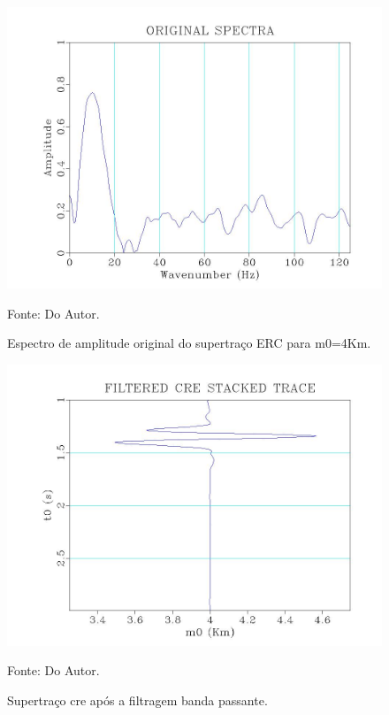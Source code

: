 \begin{figure}
\caption{Espectro de amplitude original do supertraço ERC para m0=4Km.}
\begin{center}
\includegraphics[scale=0.4]{images/originalSpectra.jpeg}
\vspace{-0.3cm}
\end{center}
\begin{center}
 Fonte: Do Autor.
\end{center}
\label{fig:7.3}
\end{figure}

\begin{figure}
\caption{Supertraço cre após a filtragem banda passante.}
\begin{center}
\includegraphics[scale=0.4]{images/creStackedSectionFiltered.jpeg}
\vspace{-0.3cm}
\end{center}
\begin{center}
 Fonte: Do Autor.
\end{center}
\label{fig:7.4}
\end{figure}

